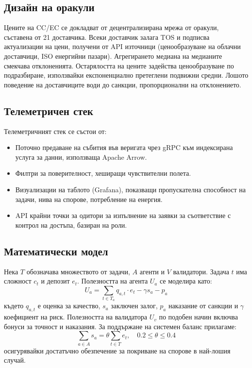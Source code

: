 \documentclass[11pt]{article}
\begin{document}
\subsection{Дизайн на оракули}
Цените на CC/EC се докладват от децентрализирана мрежа от оракули, съставена от 21 доставчика. Всеки доставчик залага TOS и подписва актуализации на цени, получени от API източници (ценообразуване на облачни доставчици, ISO енергийни пазари). Агрегирането медиана на медианите смекчава отклоненията. Остарялостта на цените задейства ценообразуване по подразбиране, използвайки експоненциално претеглени подвижни средни. Лошото поведение на доставчиците води до санкции, пропорционални на отклонението.

\subsection{Телеметричен стек}
Телеметричният стек се състои от:
\begin{itemize}[noitemsep]
  \item Поточно предаване на събития във веригата чрез gRPC към индексирана услуга за данни, използваща Apache Arrow.
  \item Филтри за поверителност, хеширащи чувствителни полета.
  \item Визуализации на таблото (Grafana), показващи пропускателна способност на задачи, нива на спорове, потребление на енергия.
  \item API крайни точки за одитори за изпълнение на заявки за съответствие с контрол на достъпа, базиран на роли.
\end{itemize}

\subsection{Математически модел}
Нека $T$ обозначава множеството от задачи, $A$ агенти и $V$ валидатори. Задача $t$ има сложност $c_t$ и депозит $e_t$. Полезността на агента $U_a$ се моделира като:
\begin{equation}
U_a = \sum_{t \in T_a} q_{a,t}\cdot e_t - \gamma s_a - p_a\label{eq:agent-utility}
\end{equation}
където $q_{a,t}$ е оценка за качество, $s_a$ заключен залог, $p_a$ наказание от санкции и $\gamma$ коефициент на риск. Полезността на валидатора $U_v$ по подобен начин включва бонуси за точност и наказания. За поддържане на системен баланс прилагаме:
\begin{equation}
\sum_{a \in A} s_a = \theta \sum_{t \in T} e_t,\quad 0.2 \leq \theta \leq 0.4
\end{equation}
осигурявайки достатъчно обезпечение за покриване на спорове в най-лошия случай.
\end{document}
